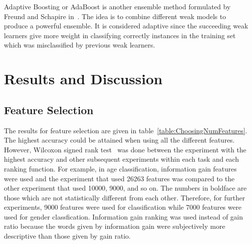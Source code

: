\documentclass[a4paper]{llncs}
\begin{document}
Adaptive Boosting or AdaBoost is another ensemble method formulated by Freund and Schapire in~\cite{freund1997decision}. The idea is to combine different weak models to produce a powerful ensemble. It is considered adaptive since the succeeding weak learners give more weight in classifying correctly instances in the training set which was misclassified by previous weak learners. 


\section{Results and Discussion}	

\subsection{Feature Selection}
The results for feature selection are given in table~\ref{table:ChoosingNumFeatures}. The highest accuracy could be attained when using all the different features. However, Wilcoxon signed rank test~\cite{wilcoxon1945individual} was done between the experiment with the highest accuracy and other subsequent experiments within each task and each ranking function. For example, in age classification, information gain features were used and the experiment that used 26263 features was compared to the other experiment that used 10000, 9000, and so on. The numbers in boldface are those which are not statistically different from each other. Therefore, for further experiments, 9000 features were used for classification while 7000 features were used for gender classfication. Information gain ranking was used instead of gain ratio because the words given by information gain were subjectively more descriptive than those given by gain ratio. 


\end{document}
